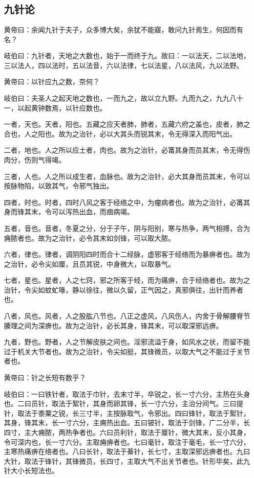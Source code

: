 \documentclass[a4paper,12pt,UTF8,twoside]{ctexbook}
\begin{document}
	\part{}
	\chapter{九针论}
		
	黄帝曰：余闻九针于夫子，众多博大矣，余犹不能寤，敢问九针焉生，何因而有名？
	
	岐伯曰：九针者，天地之大数也，始于一而终于九。故曰：一以法天，二以法地，三以法人，四以法时，五以法音，六以法律，七以法星，八以法风，九以法野。
	
	黄帝曰：以针应九之数，奈何？
	
	岐伯曰：夫圣人之起天地之数也，一而九之，故以立九野。九而九之，九九八十一，以起黄钟数焉，以针应数也。
	
	一者，天也。天者，阳也。五藏之应天者肺，肺者，五藏六府之盖也，皮者，肺之合也，人之阳也。故为之治针，必以大其头而锐其末，令无得深入而阳气出。
	
	二者，地也。人之所以应土者，肉也。故为之治针，必筩其身而员其末，令无得伤肉分，伤则气得竭。
	
	三者，人也。人之所以成生者，血脉也。故为之治针，必大其身而员其末，令可以按脉物陷，以致其气，令邪气独出。
	
	四者，时也。时者，四时八风之客于经络之中，为瘤病者也。故为之治针，必筩其身而锋其末，令可以泻热出血，而痼病竭。
	
	五者，音也。音者，冬夏之分，分于子午，阴与阳别，寒与热争，两气相搏，合为痈脓者也。故为之治针，必令其末如剑锋，可以取大脓。
	
	六者，律也。律者，调阴阳四时而合十二经脉，虚邪客于经络而为暴痹者也。故为之治针，必令尖如厘，且员其锐，中身微大，以取暴气。
	
	七者，星也。星者，人之七窍，邪之所客于经，而为痛痹，合于经络者也。故为之治针，令尖如蚊虻喙，静以徐往，微以久留，正气因之，真邪俱往，出针而养者也。
	
	八者，风也。风者，人之股肱八节也。八正之虚风，八风伤人，内舍于骨解腰脊节腠理之间为深痹也。故为之治针，必长其身，锋其末，可以取深邪远痹。
	
	九者，野也。野者，人之节解皮肤之间也。淫邪流溢于身，如风水之状，而留不能过于机关大节者也。故为之治针，令尖如挺，其锋微员，以取大气之不能过于关节者也。
	
	黄帝曰：针之长短有数乎？
	
	岐伯曰：一曰铁针者，取法于巾针，去末寸半，卒锐之，长一寸六分，主热在头身也。二曰员针，取法于絮针，其身而卵其锋，长一寸六分，主治分间气。三曰提针，取法于黍粟之锐，长三寸半，主按脉取气，令邪出。四曰锋针，取法于絮针，其身，锋其末，长一寸六分，主痈热出血。五曰铍针，取法于剑锋，广二分半，长四寸，主大痈脓，两热争者也。六曰员利针，取法于厘针，微大其末，反小其身，令可深内也，长一寸六分。主取痈痹者也。七曰毫针，取注于毫毛，长一寸六分，主寒热痛痹在络者也。八曰长针，取法于綦针，长七寸，主取深邪远痹者也。九曰大针，取法于锋针，其锋微员，长四寸，主取大气不出关节者也。针形毕矣，此九针大小长短法也。
	
\end{document}
